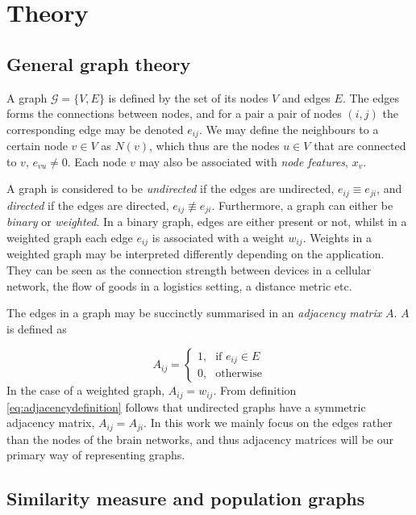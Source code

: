 \chapter{Theory}

\section{General graph theory}

A graph $\mathcal{G} = \{V, E \} $ is defined by the set of its nodes $V$ and edges $E$. The edges forms the connections between nodes, and for a pair a pair of nodes $(i,j)$ the corresponding edge may be denoted $e_{ij}$. We may define the neighbours to a certain node $v \in V$ as $N(v)$, which thus are the nodes $u \in V$ that are connected to $v$, $e_{vu} \neq 0$. Each node $v$ may also be associated with \textit{node features}, $x_v$.

A graph is considered to be \textit{undirected} if the edges are undirected, $e_{ij} \equiv e_{ji}$, and \textit{directed} if the edges are directed, $e_{ij} \not\equiv e_{ji}$. Furthermore, a graph can either be \textit{binary} or \textit{weighted}. In a binary graph, edges are either present or not, whilst in a weighted graph each edge $e_{ij}$ is associated with a weight $w_{ij}$. \cite{source} Weights in a weighted graph may be interpreted differently depending on the application. They can be seen as the connection strength between devices in a cellular network, the flow of goods in a logistics setting, a distance metric etc.

The edges in a graph may be succinctly summarised in an \textit{adjacency matrix} $A$. $A$ is defined as

\begin{equation}
    A_{ij} = \begin{cases} \mbox{1,} & \mbox{if } e_{ij} \in E \\ \mbox{0,} & \mbox{otherwise} \end{cases}
    \label{eq:adjacencydefinition}
\end{equation}
In the case of a weighted graph, $A_{ij} = w_{ij}$. From definition \eqref{eq:adjacencydefinition} follows that undirected graphs have a symmetric adjacency matrix, $A_{ij} = A_{ji}$. In this work we mainly focus on the edges rather than the nodes of the brain networks, and thus adjacency matrices will be our primary way of representing graphs.

\section{Similarity measure and population graphs}

